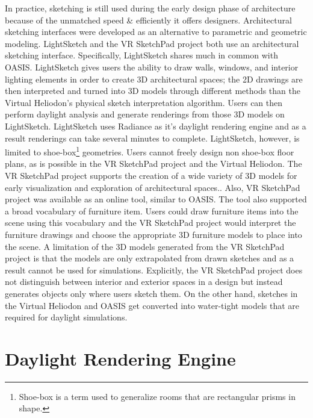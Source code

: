 	In practice, sketching is still used during the early design phase of architecture because of the unmatched speed \& efficiently it offers designers\cite{Galasiu}.
	Architectural sketching interfaces were developed as an alternative to parametric and geometric modeling.
	LightSketch and the VR SketchPad project both use an architectural sketching interface\cite{do2001vr,glaser2003sketch}.
	Specifically, LightSketch shares much in common with OASIS.
	LightSketch gives users the ability to draw walls, windows, and interior lighting elements in order to create 3D architectural spaces\cite{glaser2003sketch}; 
	the 2D drawings are then interpreted and turned into 3D models through different methods than the Virtual Heliodon's physical sketch interpretation algorithm.
	Users can then perform daylight analysis and generate renderings from those 3D models on LightSketch.
	LightSketch uses Radiance as it's daylight rendering engine and as a result renderings can take several minutes to complete.
	LightSketch, however, is limited to shoe-box\footnote{Shoe-box is a term used to generalize rooms that are rectangular prisms in shape.} geometries.
	Users cannot freely design non shoe-box floor plans, as is possible in the VR SketchPad project and the Virtual Heliodon.
	The VR SketchPad project supports the creation of a wide variety of 3D models for early visualization and exploration of architectural spaces.\cite{do2001vr}.
	Also, VR SketchPad project was available as an online tool, similar to OASIS.
	The tool also supported a broad vocabulary of furniture item.
	Users could draw furniture items into the scene using this vocabulary and the VR SketchPad project would interpret the furniture drawings and choose the appropriate 3D furniture models to place into the scene.
	A limitation of the 3D models generated from the VR SketchPad project is that the models are only extrapolated from drawn sketches and as a result cannot be used for simulations.
	Explicitly, the VR SketchPad project does not distinguish between interior and exterior spaces in a design but instead generates objects only where users sketch them.
	On the other hand, sketches in the Virtual Heliodon and OASIS get converted into water-tight models that are required for daylight simulations.\\

\section{Daylight Rendering Engine}

